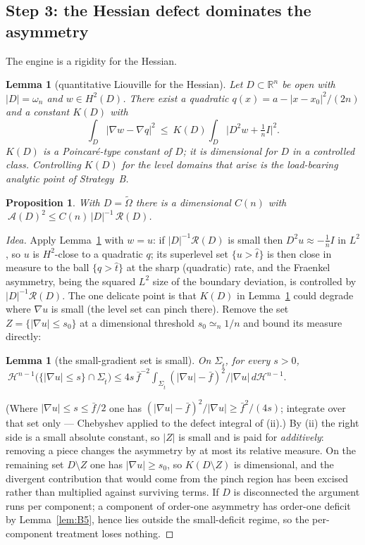 \documentclass[11pt]{amsart}
\newtheorem{proposition}[theorem]{Proposition}
\newtheorem{lemma}[theorem]{Lemma}
\theoremstyle{definition}
\theoremstyle{remark}
\newcommand{\Ot}{\widetilde\Omega}
\newcommand{\St}{\Sigma_{\hat t}}
\newcommand{\Asym}{\mathcal A}
\newcommand{\Hess}{D^2u}
\newcommand{\R}{\mathcal R}
\newcommand{\Rn}{\mathbb R^n}
\newcommand{\Hn}{\mathcal H^{n-1}}
\begin{document}
\subsection{Step 3: the Hessian defect dominates the asymmetry}
The engine is a rigidity for the Hessian.
\begin{lemma}[quantitative Liouville for the Hessian]\label{lem:B2}
Let $D\subset\Rn$ be open with $|D|=\omega_n$ and $w\in H^2(D)$. There exist a
quadratic $q(x)=a-|x-x_0|^2/(2n)$ and a constant $K(D)$ with
\[
  \int_D|\nabla w-\nabla q|^2\ \le\ K(D)\int_D\bigl|D^2w+\tfrac1n I\bigr|^2 .
\]
$K(D)$ is a Poincar\'e-type constant of $D$; it is dimensional for $D$ in a
controlled class. Controlling $K(D)$ for the level domains that arise is the
load-bearing analytic point of Strategy~B.
\end{lemma}
\begin{proposition}\label{prop:B3}
With $D=\Ot$ there is a dimensional $C(n)$ with
$\ \Asym(D)^2\le C(n)\,|D|^{-1}\,\R(D)$.
\end{proposition}
\begin{proof}[Idea]
Apply Lemma~\ref{lem:B2} with $w=u$: if $|D|^{-1}\R(D)$ is small then
$\Hess\approx-\tfrac1n I$ in $L^2$, so $u$ is $H^2$-close to a quadratic $q$;
its superlevel set $\{u>\hat t\}$ is then close in measure to the ball
$\{q>\hat t\}$ at the sharp (quadratic) rate, and the Fraenkel asymmetry,
being the squared $L^2$ size of the boundary deviation, is controlled by
$|D|^{-1}\R(D)$. The one delicate point is that $K(D)$ in
Lemma~\ref{lem:B2} could degrade where $\nabla u$ is small (the level set can
pinch there). Remove the set $Z=\{|\nabla u|\le s_0\}$ at a dimensional
threshold $s_0\simeq_n1/n$ and bound its measure directly:
\begin{lemma}[the small-gradient set is small]\label{lem:B4}
On $\St$, for every $s>0$,
$\ \Hn\bigl(\{|\nabla u|\le s\}\cap\St\bigr)\le
4s\,\bar f^{-2}\int_{\St}(|\nabla u|-\bar f)^2/|\nabla u|\,d\Hn.$
\end{lemma}
\noindent(Where $|\nabla u|\le s\le\bar f/2$ one has
$(|\nabla u|-\bar f)^2/|\nabla u|\ge\bar f^2/(4s)$; integrate over that set
only --- Chebyshev applied to the defect integral of (ii).) By (ii) the right
side is a small absolute constant, so $|Z|$ is small and is paid for
\emph{additively}: removing a piece changes the asymmetry by at most its
relative measure. On the remaining set $D\setminus Z$ one has
$|\nabla u|\ge s_0$, so $K(D\setminus Z)$ is dimensional, and the divergent
contribution that would come from the pinch region has been excised rather
than multiplied against surviving terms. If $D$ is disconnected the argument
runs per component; a component of order-one asymmetry has order-one deficit
by Lemma~\ref{lem:B5}, hence lies outside the small-deficit regime, so the
per-component treatment loses nothing.
\end{proof}
\end{document}
